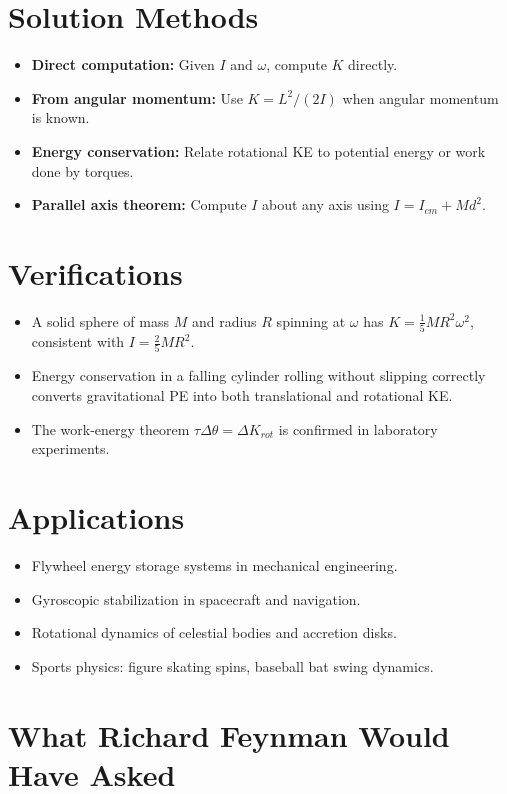 \section*{Solution Methods}

\begin{itemize}
    \item \textbf{Direct computation:} Given $I$ and $\omega$, compute $K$ directly.
    \item \textbf{From angular momentum:} Use $K = L^2/(2I)$ when angular momentum is known.
    \item \textbf{Energy conservation:} Relate rotational KE to potential energy or work done by torques.
    \item \textbf{Parallel axis theorem:} Compute $I$ about any axis using $I = I_{cm} + Md^2$.
\end{itemize}
\section*{Verifications}

\begin{itemize}
    \item A solid sphere of mass $M$ and radius $R$ spinning at $\omega$ has $K = \frac{1}{5}MR^2\omega^2$, consistent with $I = \frac{2}{5}MR^2$.
    \item Energy conservation in a falling cylinder rolling without slipping correctly converts gravitational PE into both translational and rotational KE.
    \item The work-energy theorem $\tau\Delta\theta = \Delta K_{rot}$ is confirmed in laboratory experiments.
\end{itemize}
\section*{Applications}

\begin{itemize}
    \item Flywheel energy storage systems in mechanical engineering.
    \item Gyroscopic stabilization in spacecraft and navigation.
    \item Rotational dynamics of celestial bodies and accretion disks.
    \item Sports physics: figure skating spins, baseball bat swing dynamics.
\end{itemize}
\section*{What Richard Feynman Would Have Asked}

